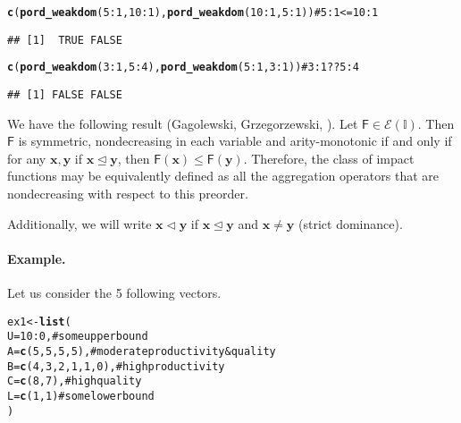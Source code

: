 \documentclass[11pt]{article}\usepackage{graphicx, color}
\makeatletter
\newcommand{\hlfunctioncall}[1]{\textcolor[rgb]{0.501960784313725,0,0.329411764705882}{\textbf{#1}}}%
\newcommand{\hlcomment}[1]{\textcolor[rgb]{0.180392156862745,0.6,0.341176470588235}{#1}}%
\newenvironment{kframe}{%
 \def\at@end@of@kframe{}%
 \ifinner\ifhmode%
  \def\at@end@of@kframe{\end{minipage}}%
  \begin{minipage}{\columnwidth}%
 \fi\fi%
 \def\FrameCommand##1{\hskip\@totalleftmargin \hskip-\fboxsep
 \colorbox{shadecolor}{##1}\hskip-\fboxsep
     \hskip-\linewidth \hskip-\@totalleftmargin \hskip\columnwidth}%
 \MakeFramed {\advance\hsize-\width
   \@totalleftmargin\z@ \linewidth\hsize
   \@setminipage}}%
 {\par\unskip\endMakeFramed%
 \at@end@of@kframe}
\newenvironment{knitrout}{}{} %
\newcommand{\vect}[1]{{\mathbf{#1}}}
\newcommand{\func}[1]{{\mathsf{#1}}}
\newcommand{\Ival}{\mathbb{I}}
\theoremstyle{remark}
\theoremstyle{definition}
\makeatother
\begin{document}
\begin{knitrout}\small
{}\color{fgcolor}\begin{kframe}
\begin{alltt}
\hlfunctioncall{c}(\hlfunctioncall{pord_weakdom}(5:1, 10:1), \hlfunctioncall{pord_weakdom}(10:1, 5:1)) \hlcomment{# 5:1 <= 10:1}
\end{alltt}
\begin{verbatim}
## [1]  TRUE FALSE
\end{verbatim}
\begin{alltt}
\hlfunctioncall{c}(\hlfunctioncall{pord_weakdom}(3:1, 5:4),  \hlfunctioncall{pord_weakdom}(5:1, 3:1))  \hlcomment{# 3:1 ?? 5:4}
\end{alltt}
\begin{verbatim}
## [1] FALSE FALSE
\end{verbatim}
\end{kframe}
\end{knitrout}


We have the following result
(Gagolewski, Grzegorzewski, \cite{GagolewskiGrzegorzewski2011:ijar}).
Let $\func{F}\in \mathcal{E}(\Ival)$. Then $\func{F}$
is symmetric, nondecreasing in each variable
and arity-monotonic if and only if for any $\vect{x},\vect{y}$
if $\vect{x}\trianglelefteq\vect{y}$, then
$\func{F}(\vect{x})\le \func{F}(\vect{y})$.
Therefore, the class of  impact functions may be equivalently
defined as all the aggregation operators
that are nondecreasing with respect to this preorder.


Additionally, we will write $\vect{x}\vartriangleleft\vect{y}$ if
$\vect{x}\trianglelefteq\vect{y}$ and $\vect{x}\neq\vect{y}$
(strict dominance).


\paragraph{Example.} Let us consider the 5 following vectors.


\begin{knitrout}\small
{}\color{fgcolor}\begin{kframe}
\begin{alltt}
ex1 <- \hlfunctioncall{list}(
   U = 10:0,           \hlcomment{# some upper bound}
   A = \hlfunctioncall{c}(5,5,5,5),     \hlcomment{# moderate productivity & quality}
   B = \hlfunctioncall{c}(4,3,2,1,1,0), \hlcomment{# high productivity}
   C = \hlfunctioncall{c}(8,7),         \hlcomment{# high quality}
   L = \hlfunctioncall{c}(1,1)          \hlcomment{# some lower bound}
)
\end{alltt}
\end{kframe}
\end{knitrout}
\end{document}
